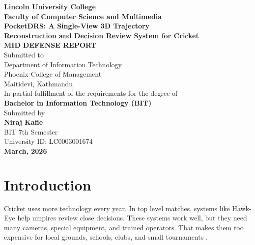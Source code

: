 \documentclass[12pt,a4paper]{article}
\begin{document}
\hypersetup{pageanchor=false}
\begin{titlepage}
\begin{center}

\textbf{\fontsize{14}{17}\selectfont Lincoln University College}\\[4pt]
\textbf{\fontsize{12}{15}\selectfont Faculty of Computer Science and Multimedia}\\[28pt]

\textbf{\fontsize{16}{19}\selectfont PocketDRS: A Single-View 3D Trajectory\\
Reconstruction and Decision Review System for Cricket}\\[24pt]

\textbf{\fontsize{14}{17}\selectfont MID DEFENSE REPORT}\\[10pt]
\fontsize{12}{15}\selectfont
Submitted to\\[4pt]
Department of Information Technology\\
Phoenix College of Management\\
Maitidevi, Kathmandu\\[20pt]

In partial fulfillment of the requirements for the degree of\\
\textbf{Bachelor in Information Technology (BIT)}\\[24pt]

Submitted by\\[8pt]
\textbf{Niraj Kafle}\\
BIT 7th Semester\\
University ID: LC0003001674\\[30pt]

\vfill
\textbf{March, 2026}

\end{center}
\end{titlepage}

\clearpage
\hypersetup{pageanchor=true}
\tableofcontents

\clearpage
{}

\section{Introduction}

Cricket uses more technology every year. In top level matches, systems like Hawk-Eye help umpires review close decisions. These systems work well, but they need many cameras, special equipment, and trained operators. That makes them too expensive for local grounds, schools, clubs, and small tournaments \cite{hawkeye2024}.
\end{document}
